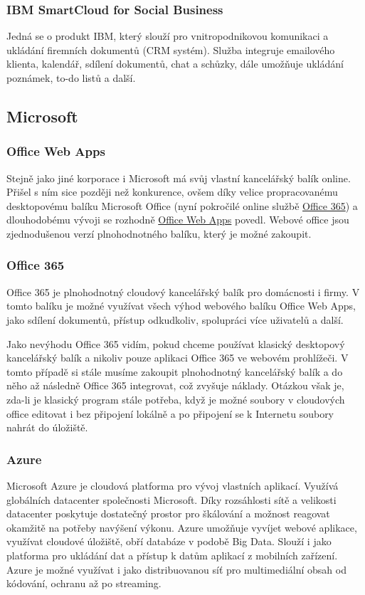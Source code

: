\subsubsection{IBM SmartCloud for Social Business}
Jedná se o produkt IBM, který slouží pro vnitropodnikovou komunikaci a ukládání firemních dokumentů (CRM systém). Služba integruje emailového klienta, kalendář, sdílení dokumentů, chat a schůzky, dále umožňuje ukládání poznámek, to-do listů a další.\cite{ibm:social}

\subsection{Microsoft}
\subsubsection{Office Web Apps}
Stejně jako jiné korporace i Microsoft má svůj vlastní kancelářský balík online. Přišel s ním sice později než konkurence, ovšem díky velice propracovanému desktopovému balíku Microsoft Office (nyní pokročilé online službě \href{https://office.microsoft.com}{Office 365}) a dlouhodobému vývoji se rozhodně \href{https://skydrive.live.com}{Office Web Apps} povedl. Webové office jsou zjednodušenou verzí plnohodnotného balíku, který je možné zakoupit.

\subsubsection{Office 365}
Office 365 je plnohodnotný cloudový kancelářský balík pro domácnosti i firmy. V tomto balíku je možné využívat všech výhod webového balíku Office Web Apps, jako sdílení dokumentů, přístup odkudkoliv, spolupráci více uživatelů a další. 

Jako nevýhodu Office 365 vidím, pokud chceme používat klasický desktopový kancelářský balík a nikoliv pouze aplikaci Office 365 ve webovém prohlížeči. V tomto případě si stále musíme zakoupit plnohodnotný kancelářský balík a do něho až následně Office 365 integrovat, což zvyšuje náklady. Otázkou však je, zda-li je klasický program stále potřeba, když je možné soubory v cloudových office editovat i bez připojení lokálně a po připojení se k Internetu soubory nahrát do úložiště.

\subsubsection{Azure}
\label{sec:Azure}
Microsoft Azure je cloudová platforma pro vývoj vlastních aplikací. Využívá globálních datacenter společnosti Microsoft. Díky rozsáhlosti sítě a velikosti datacenter poskytuje dostatečný prostor pro škálování a možnost reagovat okamžitě na potřeby navýšení výkonu. Azure umožňuje vyvíjet webové aplikace, využívat cloudové úložiště, obří databáze v podobě Big Data. Slouží i jako platforma pro ukládání dat a přístup k datům aplikací z mobilních zařízení. Azure je možné využívat i jako distribuovanou síť pro multimediální obsah od kódování, ochranu až po streaming.\cite{ms:azure}


